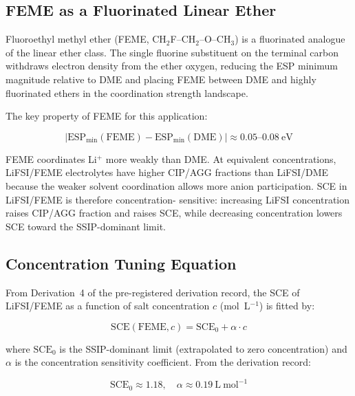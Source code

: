 \documentclass[11pt]{article}
\theoremstyle{plain}
\theoremstyle{definition}
\theoremstyle{remark}
\begin{document}
\subsection{FEME as a Fluorinated Linear Ether}

Fluoroethyl methyl ether (FEME, CH$_2$F--CH$_2$--O--CH$_3$) is a
fluorinated analogue of the linear ether class.  The single fluorine
substituent on the terminal carbon withdraws electron density from
the ether oxygen, reducing the ESP minimum magnitude relative to DME
and placing FEME between DME and highly fluorinated ethers in the
coordination strength landscape.

The key property of FEME for this application:

\begin{equation}
  |\mathrm{ESP}_{\min}(\mathrm{FEME}) - \mathrm{ESP}_{\min}(\mathrm{DME})|
  \approx 0.05\text{--}0.08~\mathrm{eV}
  \label{eq:FEME_DME_ESP}
\end{equation}

FEME coordinates Li$^+$ more weakly than DME.  At equivalent
concentrations, LiFSI/FEME electrolytes have higher CIP/AGG fractions
than LiFSI/DME because the weaker solvent coordination allows more
anion participation.  SCE in LiFSI/FEME is therefore concentration-
sensitive: increasing LiFSI concentration raises CIP/AGG fraction and
raises SCE, while decreasing concentration lowers SCE toward the
SSIP-dominant limit.

\subsection{Concentration Tuning Equation}

From Derivation~4 of the pre-registered derivation record, the SCE
of LiFSI/FEME as a function of salt concentration $c$
(mol~L$^{-1}$) is fitted by:

\begin{equation}
  \mathrm{SCE}(\mathrm{FEME}, c) = \mathrm{SCE}_0 + \alpha \cdot c
  \label{eq:FEME_conc_tuning}
\end{equation}

where $\mathrm{SCE}_0$ is the SSIP-dominant limit (extrapolated to
zero concentration) and $\alpha$ is the concentration sensitivity
coefficient.  From the derivation record:

\begin{equation}
  \mathrm{SCE}_0 \approx 1.18, \quad \alpha \approx 0.19~\mathrm{L~mol}^{-1}
  \label{eq:FEME_params}
\end{equation}
\end{document}
